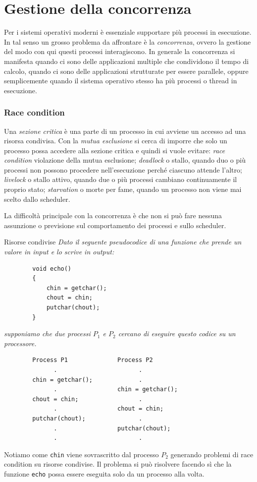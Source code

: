\chapter{Gestione della concorrenza}
Per i sistemi operativi moderni è essenziale supportare più processi in esecuzione. In tal senso un grosso problema da affrontare è la \textit{concorrenza}, ovvero la gestione del modo con qui questi processi interagiscono. In generale la concorrenza si manifesta quando ci sono delle applicazioni multiple che condividono il tempo di calcolo, quando ci sono delle applicazioni strutturate per essere parallele, oppure semplicemente quando il sistema operativo stesso ha più processi o thread in esecuzione.

\subsection*{Race condition}
Una \textit{sezione critica} è una parte di un processo in cui avviene un accesso ad una risorsa condivisa. Con la \textit{mutua esclusione} si cerca di imporre che solo un processo possa accedere alla sezione critica e quindi si vuole evitare: \textit{race condition} violazione della mutua esclusione; \textit{deadlock} o stallo, quando duo o più processi non possono procedere nell'esecuzione perché ciascuno attende l'altro; \textit{livelock} o stallo attivo, quando due o più processi cambiano continuamente il proprio stato; \textit{starvation} o morte per fame, quando un processo non viene mai scelto dallo scheduler.

La difficoltà principale con la concorrenza è che non si può fare nessuna assunzione o previsione sul comportamento dei processi e sullo scheduler.

\begin{Example}{Risorse condivise}{}
   \textit{Dato il seguente pseudocodice di una funzione che prende un valore in input e lo scrive in output:}
    \begin{verbatim}
        void echo()
        {
            chin = getchar();
            chout = chin;
            putchar(chout);
        }
    \end{verbatim}
    \textit{supponiamo che due processi $P_1$ e $P_2$ cercano di eseguire questo codice su un processore.}
    \begin{verbatim}
        Process P1              Process P2
              .                       .
        chin = getchar();             .
              .                 chin = getchar();
        chout = chin;                 .
              .                 chout = chin;
        putchar(chout);               .
              .                 putchar(chout);
              .                       .
    \end{verbatim}
    Notiamo come \verb|chin| viene sovrascritto dal processo $P_2$ generando problemi di race condition su risorse condivise. Il problema si può risolvere facendo sì che la funzione \verb|echo| possa essere eseguita solo da un processo alla volta.
\end{Example}


